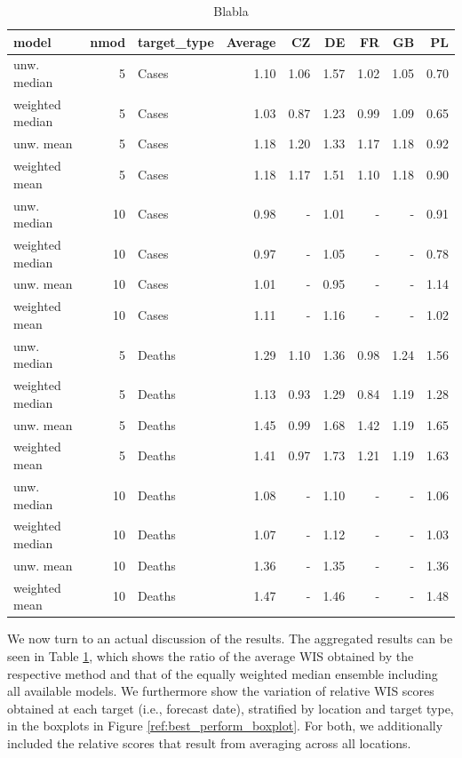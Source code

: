 \begin{table}[t]
\centering
\begin{tabular}{lrlrrrrrr}
\hline
model & nmod & target\_type & Average & CZ & DE & FR & GB & PL\\
\hline
unw. median & 5 & Cases & 1.10 & 1.06 & 1.57 & 1.02 & 1.05 & 0.70\\
weighted median & 5 & Cases & 1.03 & 0.87 & 1.23 & 0.99 & 1.09 & 0.65\\[0.4em]
unw. mean & 5 & Cases & 1.18 & 1.20 & 1.33 & 1.17 & 1.18 & 0.92\\
weighted mean & 5 & Cases & 1.18 & 1.17 & 1.51 & 1.10 & 1.18 & 0.90\\[0.4em]
unw. median & 10 & Cases & 0.98 & - & 1.01 & - & - & 0.91\\
weighted median & 10 & Cases & 0.97 & - & 1.05 & - & - & 0.78\\[0.4em]
unw. mean & 10 & Cases & 1.01 & - & 0.95 & - & - & 1.14\\
weighted mean & 10 & Cases & 1.11 & - & 1.16 & - & - & 1.02\\[0.4em]
unw. median & 5 & Deaths & 1.29 & 1.10 & 1.36 & 0.98 & 1.24 & 1.56\\
weighted median & 5 & Deaths & 1.13 & 0.93 & 1.29 & 0.84 & 1.19 & 1.28\\[0.4em]
unw. mean & 5 & Deaths & 1.45 & 0.99 & 1.68 & 1.42 & 1.19 & 1.65\\
weighted mean & 5 & Deaths & 1.41 & 0.97 & 1.73 & 1.21 & 1.19 & 1.63\\[0.4em]
unw. median & 10 & Deaths & 1.08 & - & 1.10 & - & - & 1.06\\
weighted median & 10 & Deaths & 1.07 & - & 1.12 & - & - & 1.03\\[0.4em]
unw. mean & 10 & Deaths & 1.36 & - & 1.35 & - & - & 1.36\\
weighted mean & 10 & Deaths & 1.47 & - & 1.46 & - & - & 1.48\\
\hline
\end{tabular}
\caption{Blabla}
\label{tab:rel_wis_best_performers}
\end{table}
We now turn to an actual discussion of the results. The aggregated results can be seen in Table \ref{tab:rel_wis_best_performers}, which shows the ratio of the average WIS obtained by the respective method and that of the equally weighted median ensemble including all available models. We furthermore show the variation of relative WIS scores obtained at each target (i.e., forecast date), stratified by location and target type, in the boxplots in Figure \ref{ref:best_perform_boxplot}. For both, we additionally included the relative scores that result from averaging across all locations.\\
